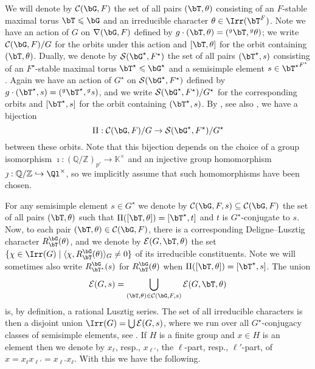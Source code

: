 \documentclass[eqthmnum, nocolour]{jt-calcs}
\begin{document}
\begin{pa}\label{pa:dl-bijection}
We will denote by $\mathcal{C}(\bG,F)$ the set of all pairs $(\bT,\theta)$ consisting of an $F$-stable maximal torus $\bT \leqslant \bG$ and an irreducible character $\theta \in \Irr(\bT^F)$. Note we have an action of $G$ on $\nabla(\bG,F)$ defined by $g\cdot (\bT,\theta) = ({}^g\bT,{}^g\theta)$; we write $\mathcal{C}(\bG,F)/G$ for the orbits under this action and $[\bT,\theta]$ for the orbit containing $(\bT,\theta)$. Dually, we denote by $\mathcal{S}(\bG^\star,F^\star)$ the set of all pairs $(\bT^{\star},s)$ consisting of an $F^\star$-stable maximal torus $\bT^{\star} \leqslant \bG^{\star}$ and a semisimple element $s \in {\bT^{\star}}^{F^{\star}}$. Again we have an action of $G^{\star}$ on $\mathcal{S}(\bG^{\star},F^{\star})$ defined by $g\cdot (\bT^{\star},s) = ({}^g\bT^{\star},{}^gs)$, and we write $\mathcal{S}(\bG^{\star},F^{\star})/G^{\star}$ for the corresponding orbits and $[\bT^{\star},s]$ for the orbit containing $(\bT^{\star},s)$. By \cite[5.21.3]{deligne-lusztig:1976:representations-of-reductive-groups}, see also \cite[13.13]{digne-michel:1991:representations-of-finite-groups-of-lie-type}, we have a bijection
\begin{equation*}
\Pi : \mathcal{C}(\bG,F)/G \to \mathcal{S}(\bG^{\star},F^{\star})/G^{\star}
\end{equation*}
between these orbits. Note that this bijection depends on the choice of a group isomorphism $\imath : (\mathbb{Q}/\mathbb{Z})_{p'} \to \mathbb{K}^{\times}$ and an injective group homomorphism $\jmath : \mathbb{Q}/\mathbb{Z} \hookrightarrow \Ql^{\times}$, so we implicitly assume that such homomorphisms have been chosen.
\end{pa}

\begin{pa}
For any semisimple element $s \in G^{\star}$ we denote by $\mathcal{C}(\bG,F,s) \subseteq \mathcal{C}(\bG,F)$ the set of all pairs $(\bT,\theta)$ such that $\Pi([\bT,\theta]) = [\bT^\star,t]$ and $t$ is $G^{\star}$-conjugate to $s$. Now, to each pair $(\bT,\theta) \in \mathcal{C}(\bG,F)$, there is a corresponding Deligne--Lusztig character $R_{\bT}^{\bG}(\theta)$, and we denote by $\mathcal{E}(G,\bT,\theta)$ the set $\{\chi \in \Irr(G) \mid \langle \chi, R_{\bT}^{\bG}(\theta)\rangle_G \neq 0\}$ of its irreducible constituents. Note we will sometimes also write $R_{\bT^{\star}}^{\bG}(s)$ for $R_{\bT}^{\bG}(\theta)$ when $\Pi([\bT,\theta]) = [\bT^{\star},s]$. The union
\begin{equation*}
\mathcal{E}(G,s) = \bigcup_{(\bT,\theta) \in \mathcal{C}(\bG,F,s)} \mathcal{E}(G,\bT,\theta)
\end{equation*}
is, by definition, a rational Lusztig series. The set of all irreducible characters is then a disjoint union $\Irr(G) = \bigcup \mathcal{E}(G,s)$, where we run over all $G^{\star}$-conjugacy classes of semisimple elements, see \cite[11.8]{bonnafe:2006:sln}. If $H$ is a finite group and $x \in H$ is an element then we denote by $x_{\ell}$, resp., $x_{\ell'}$, the $\ell$-part, resp., $\ell'$-part, of $x = x_{\ell}x_{\ell'} = x_{\ell'}x_{\ell}$. With this we have the following.
\end{pa}
\end{document}
